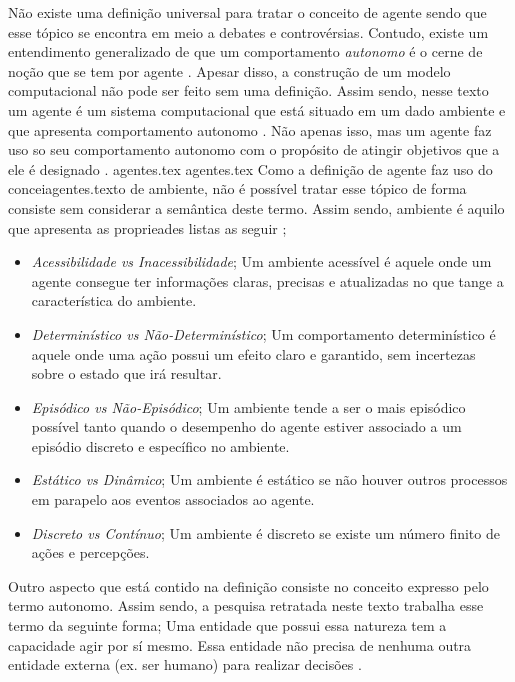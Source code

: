 Não existe uma definição universal para tratar o conceito de agente sendo que esse tópico se encontra em meio a debates e controvérsias. Contudo, existe um entendimento generalizado de que 
um comportamento \textit{autonomo} é o cerne de noção que se tem por agente \cite{whatisagent}.  Apesar disso, a construção de um modelo computacional não pode ser feito sem uma definição. Assim sendo, nesse texto um agente é
 um sistema computacional que está situado em um dado ambiente e que apresenta comportamento autonomo \cite{whatisagent} \cite{whatisagent}. Não apenas isso, mas um agente faz uso
 so seu comportamento autonomo com o propósito de atingir objetivos que a ele é designado \cite{whatisagent} \cite{whatisagent}.
agentes.tex
agentes.tex
Como a definição de agente faz uso do conceiagentes.texto de ambiente, não é possível tratar esse tópico de forma consiste sem considerar a semântica deste termo. 
Assim sendo, ambiente é aquilo que apresenta as proprieades listas as seguir \cite{artificialinteligencemodermapproach} \cite{whatisagent}; 
\begin{itemize}
    \item \textit{Acessibilidade vs Inacessibilidade}; Um ambiente acessível é aquele onde um agente consegue ter informações claras, precisas e atualizadas no que tange a característica do ambiente.
    \item \textit{Determinístico vs Não-Determinístico}; Um comportamento determinístico é aquele onde uma ação possui um efeito claro e garantido, sem incertezas sobre o estado que irá resultar.
    \item \textit{Episódico vs Não-Episódico}; Um ambiente tende a ser o mais episódico possível tanto quando o desempenho do agente estiver associado a um episódio discreto e específico no ambiente.
    \item \textit{Estático vs Dinâmico}; Um ambiente é estático se não houver outros processos em parapelo aos eventos associados ao agente.
    \item \textit{Discreto vs Contínuo}; Um ambiente é discreto se existe um número finito de ações e percepções. 
\end{itemize}

Outro aspecto que está contido na definição consiste no conceito expresso pelo termo autonomo. Assim sendo, a pesquisa retratada neste texto trabalha esse termo
da seguinte forma; Uma entidade que possui essa natureza tem a capacidade agir por sí mesmo. Essa entidade não precisa de nenhuma outra entidade externa 
(ex. ser humano) para realizar decisões \cite{whatisagent} \cite{whatisagent}.

